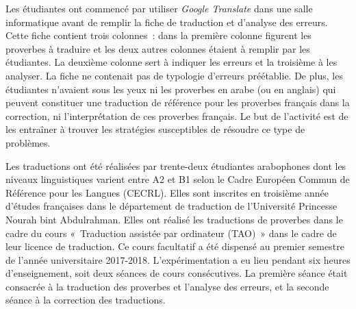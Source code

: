 \documentclass[french]{textolivre}
\begin{document}
Les étudiantes ont commencé par utiliser \textit{Google Translate} dans une salle informatique avant de remplir la fiche de traduction et d’analyse des erreurs. Cette fiche contient trois colonnes : dans la première colonne figurent les proverbes à traduire et les deux autres colonnes étaient à remplir par les étudiantes. La deuxième colonne sert à indiquer les erreurs et la troisième à les analyser. La fiche ne contenait pas de typologie d’erreurs préétablie. De plus, les étudiantes n’avaient sous les yeux ni les proverbes en arabe (ou en anglais) qui peuvent constituer une traduction de référence pour les proverbes français dans la correction, ni l’interprétation de ces proverbes français. Le but de l’activité est de les entraîner à trouver les stratégies susceptibles de résoudre ce type de problèmes. 

Les traductions ont été réalisées par trente-deux étudiantes arabophones dont les niveaux linguistiques varient entre A2 et B1 selon le Cadre Européen Commun de Référence pour les Langues (CECRL). Elles sont inscrites en troisième année d’études françaises dans le département de traduction de l’Université Princesse Nourah bint Abdulrahman. Elles ont réalisé les traductions de proverbes dans le cadre du cours « Traduction assistée par ordinateur (TAO) » dans le cadre de leur licence de traduction. Ce cours facultatif a été dispensé au premier semestre de l’année universitaire 2017-2018. L’expérimentation a eu lieu pendant six heures d’enseignement, soit deux séances de cours consécutives. La première séance était consacrée à la traduction des proverbes et l’analyse des erreurs, et la seconde séance à la correction des traductions.
\end{document}
